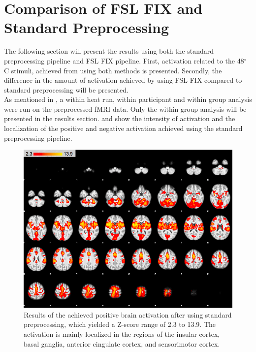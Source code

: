 \section{Comparison of FSL FIX and Standard Preprocessing}\label{sec:comp}

The following section will present the results using both the standard preprocessing pipeline and FSL FIX pipeline. First, activation related to the 48$^\circ$ C stimuli, achieved from using both methods is presented. Secondly, the difference in the amount of activation achieved by using FSL FIX compared to standard preprocessing will be presented. \\
As mentioned in , a within heat run, within participant and within group analysis were run on the preprocessed fMRI data. Only the within group analysis will be presented in the results section.  and  show the intensity of activation and the localization of the positive and negative activation achieved using the standard preprocessing pipeline.  


\begin{figure}[H]                 
	\includegraphics[width=.65\textwidth]{figures/Results/STD_pos}  
	\caption{Results of the achieved positive brain activation after using standard preprocessing, which yielded a Z-score range of 2.3 to 13.9. The activation is mainly localized in the regions of the insular cortex, basal ganglia, anterior cingulate cortex, and sensorimotor cortex.}
	\label{fig:res:stdpos} 
\end{figure}

